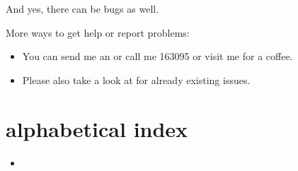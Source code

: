 \documentclass[a4paper,10pt,english]{sphinxmanual}
\begin{document}
And yes, there can be bugs as well.

More  ways to get help or report problems:
\begin{itemize}
\item {} 
You can send me an  or call me 163095 or visit me for a coffee.

\item {} 
Please also take a look at  for already existing issues.

\end{itemize}


\chapter{alphabetical index}
\label{\detokenize{index:alphabetical-index}}\begin{itemize}
\item {} 

\end{itemize}



\renewcommand{\indexname}{Index}
\printindex
\end{document}
